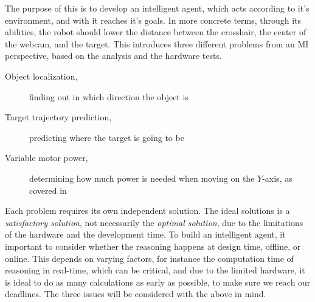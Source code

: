 The purpose of this is to develop an intelligent agent, which acts according to it's environment, and with it reaches it's goals.
In more concrete terms, through its abilities, the robot should lower the distance between the crosshair, the center of the webcam, and the target.
This introduces three different problems from an MI perspective, based on the analysis and the hardware tests.
\begin{description}
	\item[Object localization,]finding out in which direction the object is 
	\item[Target trajectory prediction,]predicting where the target is going to be
	\item[Variable motor power,]determining how much power is needed when moving on the $Y$-axis, as covered in 
\end{description}


Each problem requires its own independent solution.
The ideal solutions is a \textit{satisfactory solution}, not necessarily the \textit{optimal solution}, due to the limitations of the hardware and the development time.
To build an intelligent agent, it important to consider whether the reasoning happens at design time, offline, or online.
This depends on varying factors, for instance the computation time of reasoning in real-time, which can be critical, and due to the limited hardware, it is ideal to do as many calculations as early as possible, to make sure we reach our deadlines.
The three issues will be considered with the above in mind.


